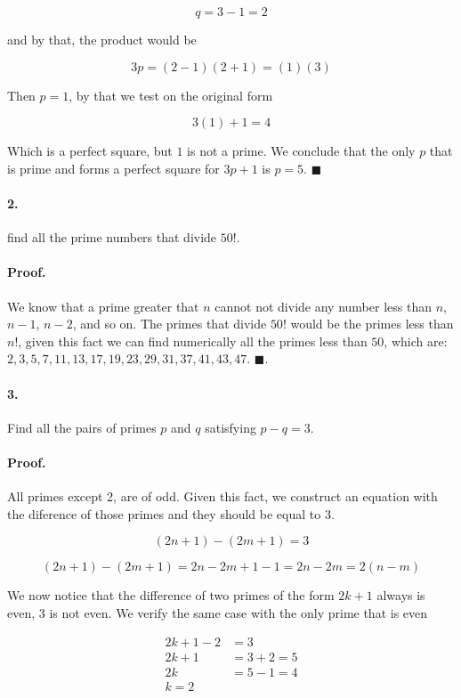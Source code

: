 \documentclass{article}
\begin{document}
$$q = 3 - 1 = 2$$

and by that, the product would be

$$3p = (2 - 1)(2 +1) = (1)(3)$$

Then $p=1$, by that we test on the original form

$$3(1) + 1 = 4$$

Which is a perfect square, but $1$ is not a prime. We conclude that the only $p$ that is prime and forms a perfect square for $3p + 1$ is $p = 5$. $\blacksquare$

\paragraph{2.} find all the prime numbers that divide $50!$.

\paragraph{Proof.} We know that a prime greater that $n$ cannot not divide any number less than $n$, $n-1$, $n-2$, and so on. The primes that divide $50!$ would be the primes less than $n!$, given this fact we can find numerically all the primes less than $50$, which are: $2, 3, 5, 7, 11, 13, 17, 19, 23, 29, 31, 37, 41, 43, 47$. $\blacksquare$.

\paragraph{3.} Find all the pairs of primes $p$ and $q$ satisfying $p - q = 3$.

\paragraph{Proof.} All primes except 2, are of odd. Given this fact, we construct an equation with the diference of those primes and they should be equal to 3.

$$(2n + 1) - (2m + 1) = 3$$

$$(2n + 1) - (2m + 1) = 2n - 2m + 1 - 1 = 2n - 2m = 2(n-m)$$

We now notice that the difference of two primes of the form $2k +1$ always is even, $3$ is not even. We verify the same case with the only prime that is even

\begin{align*}
    2k + 1 - 2 &= 3\\
    2k + 1 &= 3 + 2 = 5\\
    2k &= 5 - 1 = 4\\
    k = 2
\end{align*}
\end{document}
